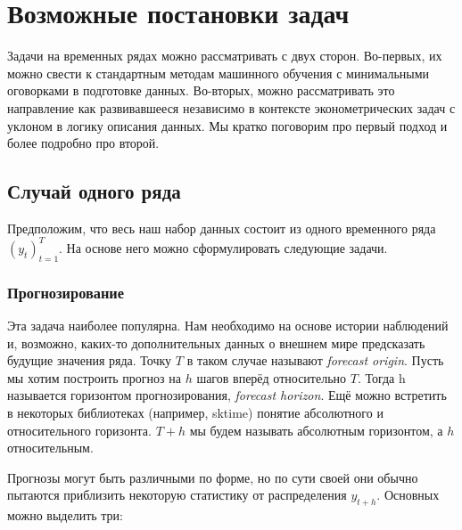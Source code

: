 \documentclass[12pt,fleqn]{article}
\begin{document}
\section{Возможные постановки задач}

Задачи на временных рядах можно рассматривать с двух сторон. Во-первых, их можно свести к стандартным методам машинного обучения с минимальными оговорками в подготовке данных. Во-вторых, можно рассматривать это направление как развивавшееся независимо в контексте эконометрических задач с уклоном в логику описания данных. Мы кратко поговорим про первый подход и более подробно про второй.

\subsection{Случай одного ряда}

Предположим, что весь наш набор данных состоит из одного временного ряда $(y_t)_{t=1}^{T}$.  На основе него можно сформулировать следующие задачи. 

\subsubsection{Прогнозирование}

Эта задача наиболее популярна. Нам необходимо на основе истории наблюдений и, возможно, каких-то дополнительных данных о внешнем мире предсказать будущие значения ряда. Точку $T$ в таком случае называют \emph{forecast origin}. Пусть мы хотим построить прогноз на $h$ шагов вперёд относительно $T$. Тогда h называется горизонтом прогнозирования, \emph{forecast horizon}. Ещё можно встретить в некоторых библиотеках (например, sktime) понятие абсолютного и относительного горизонта. $T+h$ мы будем называть абсолютным горизонтом, а $h$ относительным.

Прогнозы могут быть различными по форме, но по сути своей они обычно пытаются приблизить некоторую статистику от распределения $y_{t+h}$. Основных можно выделить три:
\end{document}
